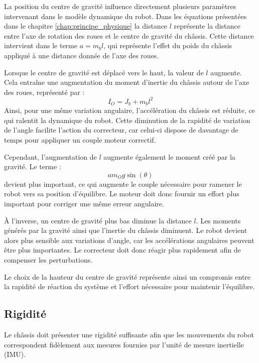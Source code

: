 La position du centre de gravité influence directement plusieurs paramètres intervenant dans le modèle dynamique du robot. 
Dans les équations présentées dans le chapitre \ref{chap:principe_physique} la distance $l$ représente la distance entre l'axe de rotation des roues et le centre de gravité du châssis. 
Cette distance intervient dans le terme $a = m_b l$, qui représente l'effet du poids du châssis appliqué à une distance donnée de l'axe des roues.

Lorsque le centre de gravité est déplacé vers le haut, la valeur de $l$ augmente. Cela entraîne une augmentation du moment d'inertie du châssis autour de l'axe des roues, représenté par :
\begin{equation}
I_O = J_b + m_b l^2
\end{equation}
Ainsi, pour une même variation angulaire, l'accélération du châssis est réduite, ce qui ralentit la dynamique du robot. Cette diminution de la rapidité de variation de l'angle facilite l'action du correcteur, car celui-ci dispose de davantage de temps pour appliquer un couple moteur correctif.

Cependant, l'augmentation de $l$ augmente également le moment créé par la gravité. Le terme :
\begin{equation}
a m_O g \sin(\theta)
\end{equation}
devient plus important, ce qui augmente le couple nécessaire pour ramener le robot vers sa position d'équilibre. Le moteur doit donc fournir un effort plus important pour corriger une même erreur angulaire.

À l'inverse, un centre de gravité plus bas diminue la distance $l$. Les moments générés par la gravité ainsi que l'inertie du châssis diminuent. Le robot devient alors plus sensible aux variations d'angle, car les accélérations angulaires peuvent être plus importantes. Le correcteur doit donc réagir plus rapidement afin de compenser les perturbations.

Le choix de la hauteur du centre de gravité représente ainsi un compromis entre la rapidité de réaction du système et l'effort nécessaire pour maintenir l'équilibre.
\subsection{Rigidité}

Le châssis doit présenter une rigidité suffisante afin que les mouvements du robot correspondent fidèlement aux mesures fournies par l'unité de mesure inertielle (IMU).

